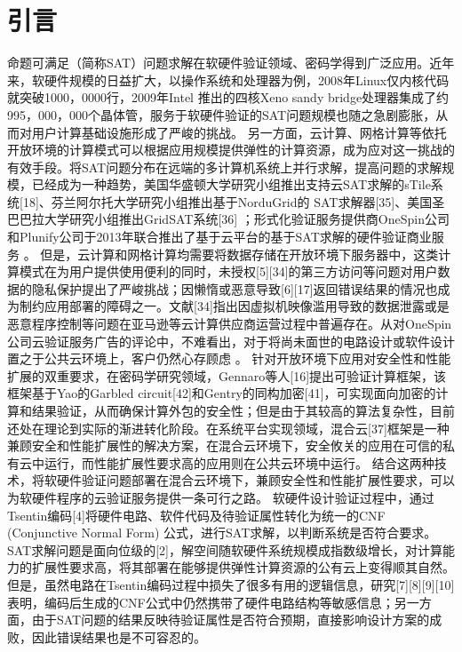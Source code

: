 \section{引言}
命题可满足\cite{SATtheory}（简称SAT）问题求解在软硬件验证领域\cite{HardwareSAT,softwareSAT}、密码学\cite{cryptoSAT}得到广泛应用。近年来，软硬件规模的日益扩大，以操作系统和处理器为例，2008年Linux仅内核代码就突破1000，0000行，2009年Intel 推出的四核Xeno sandy bridge处理器集成了约995，000，000个晶体管，服务于软硬件验证的SAT问题规模也随之急剧膨胀，从而对用户计算基础设施形成了严峻的挑战。
另一方面，云计算、网格计算等依托开放环境的计算模式可以根据应用规模提供弹性的计算资源，成为应对这一挑战的有效手段。将SAT问题分布在远端的多计算机系统上并行求解，提高问题的求解规模，已经成为一种趋势，美国华盛顿大学研究小组推出支持云SAT求解的sTile系统[18]、芬兰阿尔托大学研究小组推出基于NorduGrid的 SAT求解器[35]、美国圣巴巴拉大学研究小组推出GridSAT系统[36] ；形式化验证服务提供商OneSpin公司和Plunify公司于2013年联合推出了基于云平台的基于SAT求解的硬件验证商业服务 。
但是，云计算和网格计算均需要将数据存储在开放环境下服务器中，这类计算模式在为用户提供使用便利的同时，未授权[5][34]的第三方访问等问题对用户数据的隐私保护提出了严峻挑战；因懒惰或恶意导致[6][17]返回错误结果的情况也成为制约应用部署的障碍之一。文献[34]指出因虚拟机映像滥用导致的数据泄露或是恶意程序控制等问题在亚马逊等云计算供应商运营过程中普遍存在。从对OneSpin公司云验证服务广告的评论中，不难看出，对于将尚未面世的电路设计或软件设计置之于公共云环境上，客户仍然心存顾虑 。
针对开放环境下应用对安全性和性能扩展的双重要求，在密码学研究领域，Gennaro等人[16]提出可验证计算框架，该框架基于Yao的Garbled circuit[42]和Gentry的同构加密[41]，可实现面向加密的计算和结果验证，从而确保计算外包的安全性；但是由于其较高的算法复杂性，目前还处在理论到实际的渐进转化阶段。在系统平台实现领域，混合云[37]框架是一种兼顾安全和性能扩展性的解决方案，在混合云环境下，安全攸关的应用在可信的私有云中运行，而性能扩展性要求高的应用则在公共云环境中运行。
结合这两种技术，将软硬件验证问题部署在混合云环境下，兼顾安全性和性能扩展性要求，可以为软硬件程序的云验证服务提供一条可行之路。
软硬件设计验证过程中，通过Tsentin编码[4]将硬件电路、软件代码及待验证属性转化为统一的CNF (Conjunctive Normal Form) 公式，进行SAT求解，以判断系统是否符合要求。SAT求解问题是面向位级的[2]，解空间随软硬件系统规模成指数级增长，对计算能力的扩展性要求高，将其部署在能够提供弹性计算资源的公有云上变得顺其自然。
但是，虽然电路在Tsentin编码过程中损失了很多有用的逻辑信息，研究[7][8][9][10]表明，编码后生成的CNF公式中仍然携带了硬件电路结构等敏感信息；另一方面，由于SAT问题的结果反映待验证属性是否符合预期，直接影响设计方案的成败，因此错误结果也是不可容忍的。
